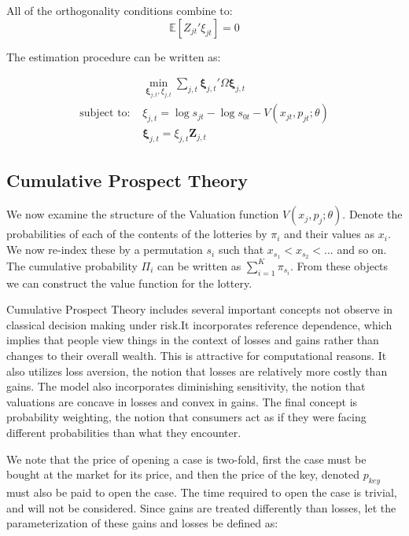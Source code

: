 \documentclass[12pt]{paper}
\newcommand{\exV}[1]{\mathbb{E} \left [ #1 \right ]}
\begin{document}
All of the orthogonality conditions combine to:
\begin{equation*}
  \exV{Z_{jt}'\xi_{jt}} = 0
\end{equation*}

The estimation procedure can be written as:

\begin{align}
  &\min_{\bm{\xi}_{j,t}, \xi_{j,t}} \sum_{j,t}\bm{\xi}_{j,t}' \Omega \bm{\xi}_{j,t}\\
  \text{subject to: } &\xi_{j,t} = \log s_{jt} - \log s_{0t} - V( x_{jt}, p_{jt}; \theta)\\
  &\bm{\xi}_{j,t} = \xi_{j,t} \bm{Z}_{j,t}  
\end{align}



\subsection{Cumulative Prospect Theory}


We now examine the structure of the Valuation function $V( x_j,
p_j; \theta)$. Denote the probabilities of each of the contents of the
lotteries by $\pi_i$ and their values as $x_i$. We now re-index these by
a permutation $s_i$ such that $x_{s_1} < x_{s_2} < ...$ and so on. The
cumulative probability $\Pi_i$ can be written as $\sum_{i=1}^K
\pi_{s_i}$. From these objects we can construct the value function for
the lottery.

Cumulative Prospect Theory includes several important concepts not
observe in classical decision making under risk.It incorporates
reference dependence, which implies that people view things in the
context of losses and gains rather than changes to their overall
wealth. This is attractive for computational reasons. It also utilizes
loss aversion, the notion that losses are relatively more costly than
gains. The model also incorporates diminishing sensitivity, the notion
that valuations are concave in losses and convex in gains. The final
concept is probability weighting, the notion that consumers act as if
they were facing different probabilities than what they encounter.

We note that the price of opening a case is two-fold, first the case
must be bought at the market for its price, and then the price of the
key, denoted $p_{key}$ must also be paid to open the case. The time
required to open the case is trivial, and will not be
considered. Since gains are treated differently than losses, let the
parameterization of these gains and losses be defined as:
\end{document}

